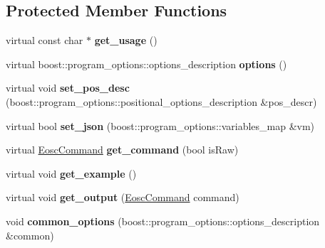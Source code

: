 \subsection*{Protected Member Functions}
\begin{DoxyCompactItemize}
\item 
\mbox{\label{classtokenika_1_1eosc_1_1_command_options_a28fb680d7477e19e523367d2585655fb}} 
virtual const char $\ast$ {\bfseries get\+\_\+usage} ()
\item 
\mbox{\label{classtokenika_1_1eosc_1_1_command_options_aa55960f380250eb7065cb6489b67196f}} 
virtual boost\+::program\+\_\+options\+::options\+\_\+description {\bfseries options} ()
\item 
\mbox{\label{classtokenika_1_1eosc_1_1_command_options_a817eaab59b5815964bc496da2c1fa607}} 
virtual void {\bfseries set\+\_\+pos\+\_\+desc} (boost\+::program\+\_\+options\+::positional\+\_\+options\+\_\+description \&pos\+\_\+descr)
\item 
\mbox{\label{classtokenika_1_1eosc_1_1_command_options_a117ff5d9632d4d9f773f49a7e6936a67}} 
virtual bool {\bfseries set\+\_\+json} (boost\+::program\+\_\+options\+::variables\+\_\+map \&vm)
\item 
\mbox{\label{classtokenika_1_1eosc_1_1_command_options_abc8896966d7f5772624aefade1e41013}} 
virtual \hyperlink{classtokenika_1_1eosc_1_1_eosc_command}{Eosc\+Command} {\bfseries get\+\_\+command} (bool is\+Raw)
\item 
\mbox{\label{classtokenika_1_1eosc_1_1_command_options_a39f81ab9ca094499d7b2f498af282b27}} 
virtual void {\bfseries get\+\_\+example} ()
\item 
\mbox{\label{classtokenika_1_1eosc_1_1_command_options_a37b5801fa36d27bc606128162fccee00}} 
virtual void {\bfseries get\+\_\+output} (\hyperlink{classtokenika_1_1eosc_1_1_eosc_command}{Eosc\+Command} command)
\item 
\mbox{\label{classtokenika_1_1eosc_1_1_command_options_aaa229149507991d88d71267d2552d20e}} 
void {\bfseries common\+\_\+options} (boost\+::program\+\_\+options\+::options\+\_\+description \&common)
\end{DoxyCompactItemize}
